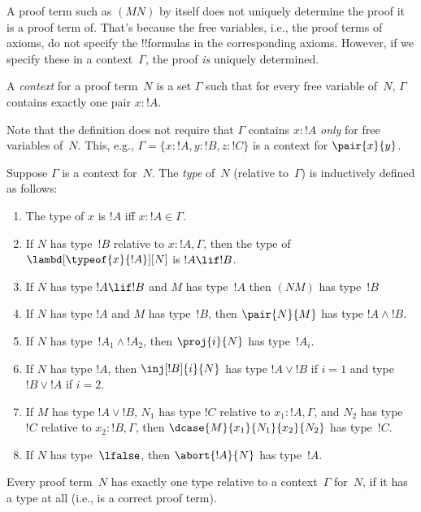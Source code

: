 \documentclass[../../../include/open-logic-section]{subfiles}
\begin{document}


A proof term such as $(MN)$ by itself does not uniquely determine the
proof it is a proof term of. That's because the free variables, i.e.,
the proof terms of axioms, do not specify the !!{formula}s in the
corresponding axioms. However, if we specify these in a
context~$\Gamma$, the proof \emph{is} uniquely determined.

\begin{defn}
A \emph{context} for a proof term~$N$ is a set $\Gamma$ such that for
every free variable of~$N$, $\Gamma$ contains exactly one pair $x : !A$.
\end{defn}

Note that the definition does not require that $\Gamma$ contains
$x:!A$ \emph{only} for free variables of~$N$. This, e.g., $\Gamma =
\{x:!A, y:!B, z:!C\}$ is a context for $\pair{x}{y}$.

\begin{defn}
  Suppose $\Gamma$ is a context for~$N$. The \emph{type} of~$N$
  (relative to~$\Gamma$) is inductively defined as follows:
  \begin{enumerate}
  \item The type of $x$ is $!A$ iff $x:!A \in \Gamma$.
  \item If $N$ has type~$!B$ relative to $x:!A, \Gamma$, then the type of $\lambd[\typeof{x}{!A}][N]$ is $!A \lif !B$.
  \item If $N$ has type $!A \lif !B$ and $M$ has type~$!A$ then $(NM)$
  has type~$!B$
  \item If $N$ has type $!A$ and $M$ has type~$!B$, then $\pair{N}{M}$
  has type $!A \land !B$.
  \item If $N$ has type~$!A_1 \land !A_2$, then $\proj{i}{N}$ has type~$!A_i$.
  \item If $N$ has type $!A$, then
    $\inj[!B]{i}{N}$ has type $!A \lor !B$ if $i=1$ and type $!B \lor
    !A$ if $i=2$.
  \item If $M$ has type $!A \lor !B$, $N_1$ has type $!C$ relative
  to $x_1:!A, \Gamma$, and $N_2$ has type~$!C$ relative to $x_2:!B,
  \Gamma$, then $\dcase{M}{x_1}{N_1}{x_2}{N_2}$ has type~$!C$.
  \item If $N$ has type~$\lfalse$, then
    $\abort{!A}{N}$ has type~$!A$.
  \end{enumerate}
\end{defn}

\begin{prop}
Every proof term~$N$ has exactly one type relative to a
context~$\Gamma$ for~$N$, if it has a type at all (i.e., is a correct
proof term).
\end{prop}
\end{document}
